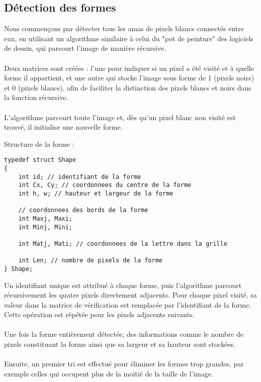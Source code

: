 \documentclass{article}
\begin{document}
\subsection{Détection des formes}

Nous commençons par détecter tous les amas de pixels blancs connectés entre eux, en utilisant un algorithme similaire à celui du "pot de peinture" des logiciels de dessin, qui parcourt l'image de manière récursive.
\\\\
Deux matrices sont créées : l'une pour indiquer si un pixel a été visité et à quelle forme il appartient, et une autre qui stocke l'image sous forme de 1 (pixels noirs) et 0 (pixels blancs), afin de faciliter la distinction des pixels blancs et noirs dans la fonction récursive.
\\\\
L'algorithme parcourt toute l'image et, dès qu'un pixel blanc non visité est trouvé, il initialise une nouvelle forme.

\noindent Structure de la forme :
\begin{lstlisting}
typedef struct Shape 
{
    int id; // identifiant de la forme
    int Cx, Cy; // coordonnees du centre de la forme
    int h, w; // hauteur et largeur de la forme

    // coordonnees des bords de la forme
    int Maxj, Maxi;
    int Minj, Mini;

    int Matj, Mati; // coordonnees de la lettre dans la grille

    int Len; // nombre de pixels de la forme
} Shape;
\end{lstlisting}

\vspace{0.5cm}
\newpage
Un identifiant unique est attribué à chaque forme, puis l'algorithme parcourt récursivement les quatre pixels directement adjacents. Pour chaque pixel visité, sa valeur dans la matrice de vérification est remplacée par l’identifiant de la forme. Cette opération est répétée pour les pixels adjacents suivants.
\\\\
Une fois la forme entièrement détectée, des informations comme le nombre de pixels constituant la forme ainsi que sa largeur et sa hauteur sont stockées.
\\\\
Ensuite, un premier tri est effectué pour éliminer les formes trop grandes, par exemple celles qui occupent plus de la moitié de la taille de l'image.
\end{document}

